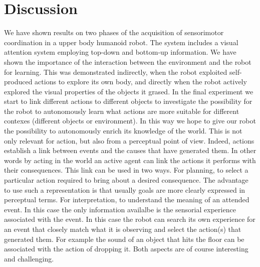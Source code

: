 \section{Discussion}
We have shown results on two phases of the acquisition of sensorimotor coordination in a upper body humanoid robot. The system includes a visual attention system employing top-down and bottom-up information. We have shown the importance of the interaction between the environment and the robot for learning. This was demonstrated indirectly, when the robot exploited self-produced actions to explore its own body, and directly when the robot actively explored the visual properties of the objects it grased. In the final experiment we start to link different actions to different objects to investigate the possibility for the robot to autonomously learn what actions are more suitable for different contexes (different objects or environment). In this way we hope to give our robot the possibility to autonomously enrich its knowledge of the world. This is not only relevant for action, but also from a perceptual point of view. Indeed, actions establish a link between events and the causes that have generated them. In other words by acting in the world an active agent can link the actions it performs with their consequences. This link can be used in two ways. For planning, to select a particular action required to bring about a desired consequence. The advantage to use such a representation is that usually goals are more clearly expressed in perceptual terms. For interpretation, to understand the meaning of an attended event. In this case the only information availalbe is the sensorial experience associated with the event. In this case the robot can search its own experience for an event that closely match what it is observing and select the action(s) that generated them. For example the sound of an object that hits the floor can be associated with the action of dropping it. Both aspects are of course interesting and challenging.
